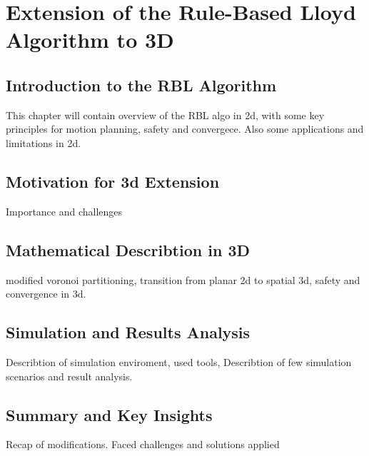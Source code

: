 \chapter{Extension of the Rule-Based Lloyd Algorithm to 3D\label{chap:rbl}}

\section{Introduction to the RBL Algorithm}

This chapter will contain overview of the RBL algo in 2d, with some key principles for motion planning, safety and convergece. Also some applications and limitations in 2d.

\section{Motivation for 3d Extension}

Importance and challenges

\section{Mathematical Describtion in 3D}

modified voronoi partitioning, transition from planar 2d to spatial 3d, safety and convergence in 3d.

\section{Simulation and Results Analysis}

Describtion of simulation enviroment, used tools, Describtion of few simulation scenarios and result analysis.

\section{Summary and Key Insights}

Recap of modifications. Faced challenges and solutions applied
